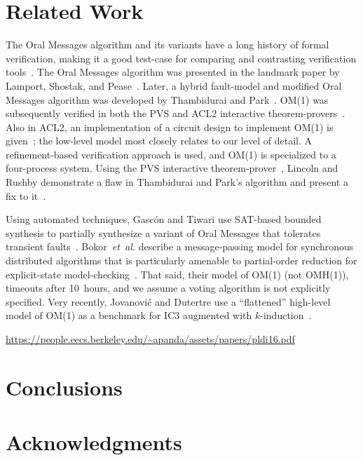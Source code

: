 \documentclass{llncs/llncs}
\newcommand{\lee}[1]{ } %
\newcommand{\lee}[1]{ {\color{blue}$<$lee: #1$>$} } %
\begin{document}
\section{Related Work}\label{sec:related}

The Oral Messages algorithm and its variants have a long history of formal verification, making it a good test-case for comparing and contrasting verification tools~\cite{pvs}. The Oral Messages algorithm was presented in the landmark paper by Lamport, Shostak, and Pease~\cite{om}. Later, a hybrid fault-model and modified Oral Messages algorithm was developed by Thambidurai and Park~\cite{hybrid}. OM(1) was subsequently verified in both the PVS and ACL2 interactive theorem-provers~\cite{Young97:IC}. Also in ACL2, an implementation of a circuit design to implement OM(1) is given~\cite{om-acl2-impl}; the low-level model most closely relates to our level of detail. A refinement-based verification approach is used, and OM(1) is specialized to a four-process system. Using the PVS interactive theorem-prover~\cite{pvs}, Lincoln and Rushby demonstrate a flaw in Thambidurai and Park's algorithm and present a fix to it~\cite{csl-93-2}.

Using automated techniques, Gasc{\'{o}}n and Tiwari use SAT-based bounded synthesis to partially synthesize a variant of Oral Messages that tolerates transient faults~\cite{om1-synth}. Bokor~\emph{et~al.} describe a message-passing model for synchronous distributed algorithms that is particularly amenable to partial-order reduction for explicit-state model-checking~\cite{Bokor2010}. That said, their model of OM(1) (not OMH(1)), timeouts after 10~hours, and we assume a voting algorithm is not explicitly specified. Very recently, Jovanovi{\'{c}} and Dutertre use a ``flattened'' high-level model of OM(1) as a benchmark for IC3 augmented with $k$-induction~\cite{pdr-kind}.

\url{https://people.eecs.berkeley.edu/~apanda/assets/papers/pldi16.pdf}

\lee{mention that ASMs similar to disjunction invariants}

\section{Conclusions}\label{sec:conclusions}

\lee{talk about compositional verification of properties, even though SAL doesn't directly support it}
\lee{talk about k-induction vs. PDR}
\lee{talk about lack of axiomatization in model-checking (multiple rushby bugs), but  tradeoff of deadlock. see proglema paper}

\lee{talk about atom-sally}

\lee{note some details still elided for implementation ---e.g., CRCs, etc.}

\section*{Acknowledgments}
\lee{NASA contract, honeywell ppl, rushby's model?}



\end{document}
